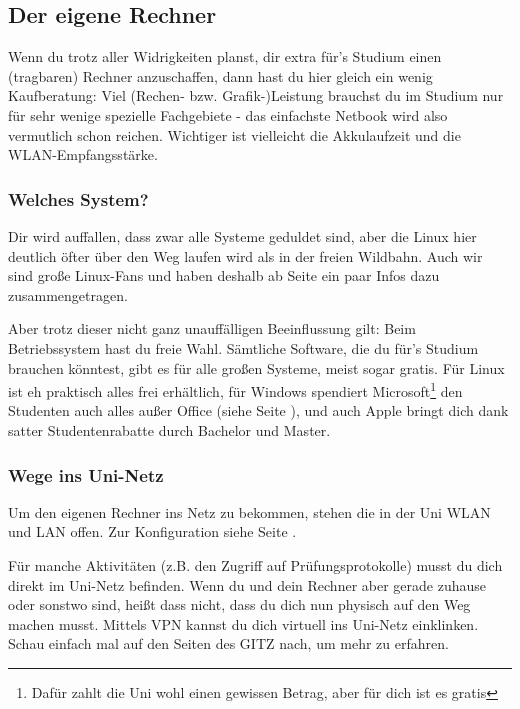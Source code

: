 
\subsection{Der eigene Rechner}
Wenn du trotz aller Widrigkeiten planst, dir extra für's Studium einen 
(tragbaren) Rechner anzuschaffen, dann hast du hier gleich ein wenig 
Kaufberatung: Viel (Rechen- bzw. Grafik-)Leistung brauchst du im Studium 
nur für sehr wenige spezielle Fachgebiete - das einfachste Netbook wird also 
vermutlich schon reichen. Wichtiger ist vielleicht die Akkulaufzeit und die WLAN-Empfangsstärke.

\subsubsection{Welches System?}
Dir wird auffallen, dass zwar alle Systeme geduldet sind, aber die Linux hier
deutlich öfter über den Weg laufen wird als in der freien Wildbahn. Auch wir
sind große Linux-Fans und haben deshalb ab Seite \pageref{linux} ein paar Infos
dazu zusammengetragen.

Aber trotz dieser nicht ganz unauffälligen Beeinflussung gilt: Beim Betriebssystem 
hast du freie Wahl. Sämtliche Software, die du für's Studium brauchen 
könntest, gibt es für alle großen Systeme, meist sogar gratis. Für Linux ist eh 
praktisch alles frei erhältlich, für Windows spendiert 
Microsoft\footnote{Dafür zahlt die Uni wohl einen gewissen Betrag, aber für dich 
ist es gratis} den Studenten auch alles außer Office (siehe Seite \pageref{msdnaa}),
und auch Apple bringt dich dank satter Studentenrabatte durch Bachelor 
und Master. 

\subsubsection{Wege ins Uni-Netz}
Um den eigenen Rechner ins Netz zu bekommen, stehen die in der Uni WLAN und LAN 
offen. Zur Konfiguration siehe Seite \pageref{wlan}.

Für manche Aktivitäten (z.B. den Zugriff auf Prüfungsprotokolle) musst du dich 
direkt im Uni-Netz befinden. Wenn du und dein Rechner aber gerade zuhause oder sonstwo sind,
heißt dass nicht, dass du dich nun physisch auf den Weg machen musst. Mittels
VPN kannst du dich virtuell ins Uni-Netz einklinken. Schau einfach mal auf
den Seiten des GITZ nach, um mehr zu erfahren.